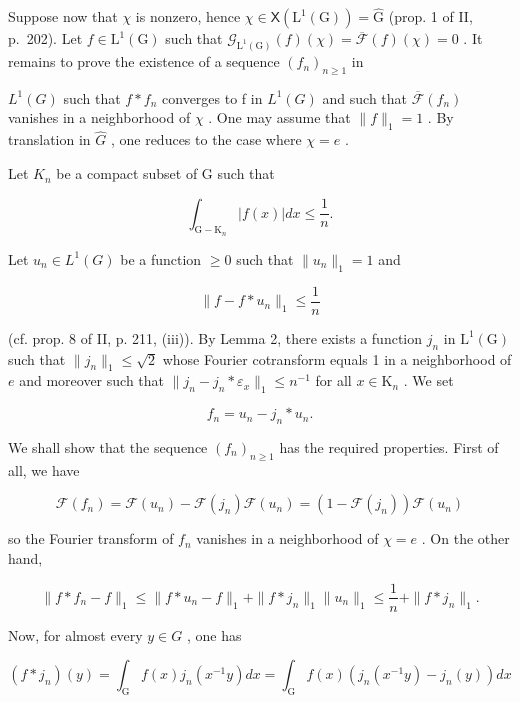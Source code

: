 Suppose now that \(\chi\) is nonzero, hence \(\chi \in \mathsf{X}(\mathrm{L}^1 (\mathrm{G})) = \widehat{\mathrm{G}}\) (prop. 1 of II, p.~202). Let \(f\in \mathrm{L}^{1}(\mathrm{G})\) such that \(\mathcal{G}_{\mathrm{L}^1 (\mathrm{G})}(f)(\chi) = \overline{\mathcal{F}} (f)(\chi) = 0\) . It remains to prove the existence of a sequence \((f_n)_{n\geqslant 1}\) in

\(L^{1}(G)\) such that \(f * f_{n}\) converges to f in \(L^{1}(G)\) and such that \(\overline{\mathcal{F}}(f_{n})\) vanishes in a neighborhood of \(\chi\) . One may assume that \(\|f\|_{1}=1\) . By translation in \(\widehat{G}\) , one reduces to the case where \(\chi=e\) .

Let \(K_{n}\) be a compact subset of G such that

\[
\int_ {\mathrm{G} - \mathrm{K} _ {n}} | f (x) | d x \leqslant \frac {1}{n}.
\]

Let \(u_{n} \in L^{1}(G)\) be a function \(\geqslant 0\) such that \(\|u_{n}\|_{1} = 1\) and

\[
\| f - f * u _ {n} \| _ {1} \leqslant \frac {1}{n}
\]

(cf. prop. 8 of II, p. 211, (iii)). By Lemma 2, there exists a function \(j_n\) in \(\mathrm{L}^1(\mathrm{G})\) such that \(\| j_n\| _1\leqslant \sqrt{2}\) whose Fourier cotransform equals 1 in a neighborhood of \(e\) and moreover such that \(\| j_{n} - j_{n}*\varepsilon_{x}\|_{1}\leqslant n^{-1}\) for all \(x\in \mathrm{K}_n\) . We set

\[
f _ {n} = u _ {n} - j _ {n} * u _ {n}.
\]

We shall show that the sequence \((f_{n})_{n\geqslant1}\) has the required properties. First of all, we have

\[
\mathcal {F} (f _ {n}) = \mathcal {F} (u _ {n}) - \mathcal {F} (j _ {n}) \mathcal {F} (u _ {n}) = (1 - \mathcal {F} (j _ {n})) \mathcal {F} (u _ {n})
\]

so the Fourier transform of \(f_{n}\) vanishes in a neighborhood of \(\chi = e\) . On the other hand,

\[
\| f * f _ {n} - f \| _ {1} \leqslant \| f * u _ {n} - f \| _ {1} + \| f * j _ {n} \| _ {1} \| u _ {n} \| _ {1} \leqslant \frac {1}{n} + \| f * j _ {n} \| _ {1}.
\]

Now, for almost every \(y \in G\) , one has

\[
(f * j _ {n}) (y) = \int_ {\mathrm{G}} f (x) j _ {n} (x ^ {- 1} y) d x = \int_ {\mathrm{G}} f (x) (j _ {n} (x ^ {- 1} y) - j _ {n} (y)) d x
\]

